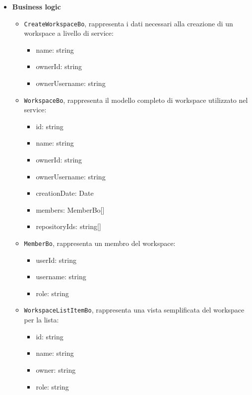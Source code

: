 \documentclass[a4paper, 11pt]{article}
\begin{document}
\begin{itemize}
\begin{itemize}
      \item \texttt{WorkspaceListResponseDto}, rappresenta la risposta contenente la lista dei workspace dell'utente:
        \begin{itemize}
          \item workspaces: WorkspaceResponseDto[]
          \item total: number
        \end{itemize}
    \end{itemize}

  \item \textbf{Business logic}
    \begin{itemize}
      \item \texttt{CreateWorkspaceBo}, rappresenta i dati necessari alla creazione di un workspace a livello di service:
        \begin{itemize}
          \item name: string
          \item ownerId: string
          \item ownerUsername: string
        \end{itemize}

      \item \texttt{WorkspaceBo}, rappresenta il modello completo di workspace utilizzato nel service:
        \begin{itemize}
          \item id: string
          \item name: string
          \item ownerId: string
          \item ownerUsername: string
          \item creationDate: Date
          \item members: MemberBo[]
          \item repositoryIds: string[]
        \end{itemize}

      \item \texttt{MemberBo}, rappresenta un membro del workspace:
        \begin{itemize}
          \item userId: string
          \item username: string
          \item role: string
        \end{itemize}

      \item \texttt{WorkspaceListItemBo}, rappresenta una vista semplificata del workspace per la lista:
        \begin{itemize}
          \item id: string
          \item name: string
          \item owner: string
          \item role: string
        \end{itemize}
    \end{itemize}


\end{itemize}
\end{document}
